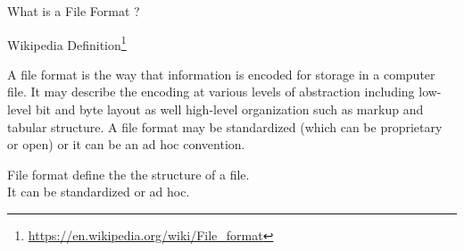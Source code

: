 \documentclass[serif, aspectratio=169]{beamer}
\begin{document}

\begin{frame}{What is a File Format ?}
    \begin{block}{Wikipedia Definition\footnote{\url{https://en.wikipedia.org/wiki/File_format}}}
        \begin{tcolorbox}
            A file format is the way that information is encoded for storage in a computer file. It may describe the encoding at various levels of abstraction including low-level bit and byte layout as well high-level organization such as markup and tabular structure. A file format may be standardized (which can be proprietary or open) or it can be an ad hoc convention.
        \end{tcolorbox}
    \end{block}
    \begin{center}
        \Large
        File format define the the structure of a file. \\
        It can be standardized or ad hoc.
    \end{center}
\end{frame}
\end{document}
